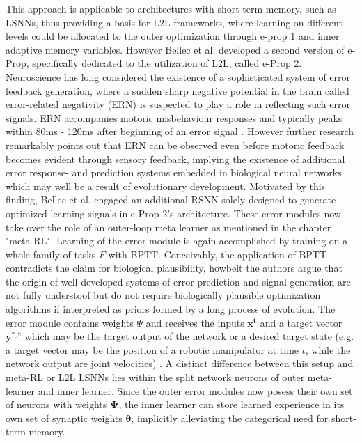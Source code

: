 \documentclass[letterpaper, 10 pt, conference]{ieeeconf}  %
\begin{document}
This approach is applicable to architectures with short-term memory, such as LSNNs, thus providing a basis for L2L frameworks, where 
learning on different levels could be allocated to the outer optimization through e-prop 1 and inner adaptive memory variables. 
\newline
However Bellec et al. developed a second version of e-Prop, specifically dedicated to the utilization of L2L, called e-Prop 2. 
Neuroscience has long considered the existence of a sophisticated system of error feedback generation, where a sudden sharp 
negative potential in the brain called error-related negativity (ERN) is suspected to play a role in reflecting such error signals.
ERN accompanies motoric misbehaviour responses and typically peaks within 80ms - 120ms after beginning of an error signal 
\cite{gehringErrorRelatedNegativity2018}\cite{dikmanErrorMonitoringReward2000}.
However further research remarkably points out that ERN can be observed even before motoric feedback becomes evident through 
sensory feedback, implying the existence of additional error response- and prediction systems embedded in biological neural networks
\cite{macleanUsingBrainPotentials2015}
which may well be a result of evolutionary development.
Motivated by this finding, Bellec et al.\cite{bellecBiologicallyInspiredAlternatives2019} engaged an additional 
RSNN solely designed to generate optimized learning signals in e-Prop 2's architecture.
These error-modules now take over the role of an outer-loop meta learner as mentioned in the chapter "meta-RL". Learning of the error module 
is again accomplished by training on a whole family of tasks $F$ with BPTT. Conceivably, the application of BPTT contradicts the claim for 
biological plausibility, howbeit the authors argue that the origin of 
well-developed systems of error-prediction and signal-generation are not fully understoof but do not require biologically plausible optimization 
algorithms if interpreted as priors formed by a long process of evolution. The error module contains weights $\Psi$ and receives the  
inputs $\mathbf{x^t}$ and a target vector $\mathbf{y^{*,t}}$ which may be the target output of the network or a desired target state 
(e.g. a target vector may 
be the position of a robotic manipulator at time $t$, while the network output are joint velocities) \cite{bellecBiologicallyInspiredAlternatives2019}.
A distinct difference 
between this setup and meta-RL or L2L LSNNs lies within the split network neurons of outer meta-learner and inner learner. Since the outer error
modules now posess their own set of neurons with weights $\mathbf{\Psi}$, the inner learner can store learned experience in 
its own set of synaptic weights
$\mathbf{\theta}$, implicitly alleviating the categorical need for short-term memory. \newline
\end{document}
